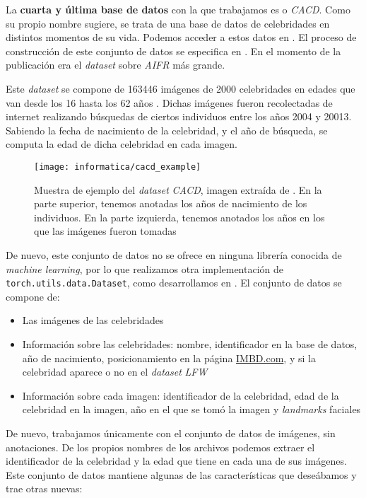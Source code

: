 La \textbf{cuarta y última base de datos} con la que trabajamos es  o \textit{CACD}. Como su propio nombre sugiere, se trata de una base de datos de celebridades en distintos momentos de su vida. Podemos acceder a estos datos en \cite{informatica:cacd_dataset}. El proceso de construcción de este conjunto de datos se especifica en \cite{informatica:paper_cacd}. En el momento de la publicación era el \textit{dataset} sobre \textit{AIFR} más grande.

Este \textit{dataset} se compone de 163446 imágenes de 2000 celebridades en edades que van desde los 16 hasta los 62 años \cite{informatica:paper_cacd}. Dichas imágenes fueron recolectadas de internet realizando búsquedas de ciertos individuos entre los años 2004 y 20013. Sabiendo la fecha de nacimiento de la celebridad, y el año de búsqueda, se computa la edad de dicha celebridad en cada imagen.

\begin{figure}[H]
    \centering
    \texttt{[image: informatica/cacd\_example]}
    \caption{Muestra de ejemplo del \textit{dataset} \textit{CACD}, imagen extraída de \cite{informatica:paper_cacd}. En la parte superior, tenemos anotadas los años de nacimiento de los individuos. En la parte izquierda, tenemos anotados los años en los que las imágenes fueron tomadas}
\end{figure}

De nuevo, este conjunto de datos no se ofrece en ninguna librería conocida de \textit{machine learning}, por lo que realizamos otra implementación de \lstinline{torch.utils.data.Dataset}, como desarrollamos en . El conjunto de datos se compone de:

\begin{itemize}
    \item Las imágenes de las celebridades
    \item Información sobre las celebridades: nombre, identificador en la base de datos, año de nacimiento, posicionamiento en la página \url{IMBD.com}, y si la celebridad aparece o no en el \textit{dataset} \textit{LFW}
    \item Información sobre cada imagen: identificador de la celebridad, edad de la celebridad en la imagen, año en el que se tomó la imagen y \textit{landmarks} faciales
\end{itemize}

De nuevo, trabajamos únicamente con el conjunto de datos de imágenes, sin anotaciones. De los propios nombres de los archivos podemos extraer el identificador de la celebridad y la edad que tiene en cada una de sus imágenes. Este conjunto de datos mantiene algunas de las características que deseábamos y trae otras nuevas:

